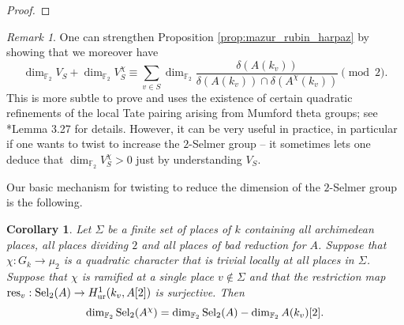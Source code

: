 \documentclass[10pt]{amsart}
\numberwithin{equation}{section}
\newtheorem{cor}[equation]{Corollary}
\theoremstyle{remark}
\newtheorem{remark}[equation]{Remark}
\theoremstyle{definition}
\theoremstyle{definition}
\theoremstyle{definition}
\theoremstyle{definition}
\theoremstyle{definition}
\theoremstyle{definition}
\theoremstyle{definition}
\theoremstyle{definition}
\begin{document}
\begin{proof}
%
%
\end{proof}

\begin{remark}
One can strengthen Proposition \ref{prop:mazur_rubin_harpaz} by showing that we moreover have 
\[
\dim_{\mathbb{F}_2} V_S  + \dim_{\mathbb{F}_2} V_S^{\chi} \equiv  \sum_{v \in S} \dim_{\mathbb{F}_2} \frac{\delta(A(k_v))}{\delta(A(k_v)) \cap \delta(A^{\chi}(k_v))} \pmod 2.
\]
This is more subtle to prove and uses the existence of certain quadratic refinements of the local Tate pairing arising from Mumford theta groups; see \cite{Har19}*{Lemma 3.27} for details. However, it can be very useful in practice, in particular if one wants to twist to increase the $2$-Selmer group -- it sometimes lets one deduce that $\dim_{\mathbb{F}_2}V_S^\chi>0$ just by understanding $V_S$. 
\end{remark}
 
 Our basic mechanism for twisting to reduce the dimension of the $2$-Selmer group is the following. 
  
\begin{cor} \label{cor:selmer-change}
Let $\Sigma$ be a finite set of places of $k$ containing all archimedean places, all places dividing $2$ and all places of bad reduction for $A$. Suppose that $\chi:G_k\to \mu_2$ is a quadratic character that is trivial locally at all places in $\Sigma$. Suppose that $\chi$ is ramified at a single place $v\notin \Sigma$ and that the restriction map $\textup{res}_v:\textup{Sel}_2(A)\to H^1_{\textup{ur}}(k_v,A[2])$ is surjective. Then \[\dim_{\mathbb{F}_2} \textup{Sel}_2(A^{\chi}) = \dim_{\mathbb{F}_2} \textup{Sel}_2(A)  - \dim_{\mathbb{F}_2} A(k_v)[2].\]
\end{cor}
\end{document}
